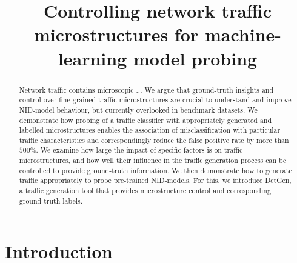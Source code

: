 \documentclass[runningheads]{llncs}
\begin{document}
\title{Controlling network traffic microstructures for machine-learning model probing}
%
%
%
%
%
\maketitle 

\begin{abstract}
Network traffic contains microscopic ...
We argue that ground-truth insights and control over fine-grained traffic microstructures are crucial to understand and improve NID-model behaviour, but currently overlooked in benchmark datasets. We demonstrate how  probing of a traffic classifier with appropriately generated and labelled microstructures enables the association of misclassification with particular traffic characteristics and correspondingly reduce the false positive rate by more than $500\%$. We examine how large the impact of specific factors is on traffic microstructures, and how well their influence in the traffic generation process can be controlled to provide ground-truth information. We then demonstrate how to generate traffic appropriately to probe pre-trained NID-models. 
For this, we introduce DetGen, a traffic generation tool that provides microstructure control and corresponding ground-truth labels.
\end{abstract}





\section{Introduction}
\end{document}
